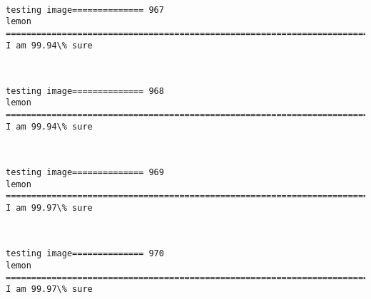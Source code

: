 \documentclass[11pt]{article}
\begin{document}
    \begin{center}
    \end{center}
    { \hspace*{\fill} \\}
    
    \begin{Verbatim}[commandchars=\\\{\}]
testing image============== 967
lemon
============================================================================
I am 99.94\% sure

    \end{Verbatim}

    \begin{center}
    \end{center}
    { \hspace*{\fill} \\}
    
    \begin{Verbatim}[commandchars=\\\{\}]
testing image============== 968
lemon
============================================================================
I am 99.94\% sure

    \end{Verbatim}

    \begin{center}
    \end{center}
    { \hspace*{\fill} \\}
    
    \begin{Verbatim}[commandchars=\\\{\}]
testing image============== 969
lemon
============================================================================
I am 99.97\% sure

    \end{Verbatim}

    \begin{center}
    \end{center}
    { \hspace*{\fill} \\}
    
    \begin{Verbatim}[commandchars=\\\{\}]
testing image============== 970
lemon
============================================================================
I am 99.97\% sure

    \end{Verbatim}
\end{document}
